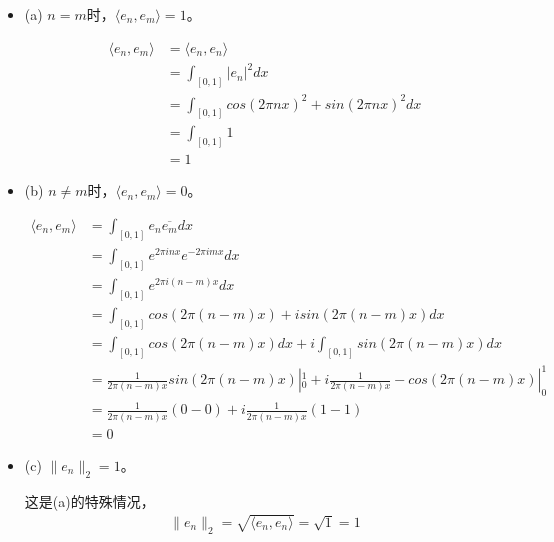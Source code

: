 \documentclass{article}
\begin{document}
\begin{itemize}
  \item (a) $n = m$时，$\langle e_n, e_m \rangle = 1$。

        \begin{align*}
          \langle e_n, e_m \rangle
           & = \langle e_n, e_n \rangle                         \\
           & = \int_{[0, 1]} |e_n|^2 dx                         \\
           & = \int_{[0, 1]} cos(2\pi nx)^2 + sin(2\pi nx)^2 dx \\
           & = \int_{[0, 1]} 1                                  \\
           & = 1
        \end{align*}

  \item (b) $n \neq m$时，$\langle e_n, e_m \rangle = 0$。

        \begin{align*}
          \langle e_n, e_m \rangle
           & = \int_{[0, 1]} e_n \overline{e_m} dx                                                       \\
           & = \int_{[0, 1]} e^{2\pi inx}e^{-2\pi imx} dx                                                \\
           & = \int_{[0, 1]} e^{2\pi i(n-m)x} dx                                                         \\
           & = \int_{[0, 1]} cos(2\pi (n-m)x) + isin(2\pi (n-m)x) dx                                     \\
           & = \int_{[0, 1]} cos(2\pi (n-m)x)dx + i\int_{[0, 1]}sin(2\pi (n-m)x) dx                      \\
           & = \frac{1}{2\pi (n-m)x}sin(2\pi (n-m)x)|_0^1 + i\frac{1}{2\pi (n-m)x}-cos(2\pi (n-m)x)|_0^1 \\
           & = \frac{1}{2\pi (n-m)x}(0 - 0) + i\frac{1}{2\pi (n-m)x}(1 - 1)                              \\
           & = 0
        \end{align*}

  \item (c) $\|e_n\|_2 = 1$。

        这是(a)的特殊情况，
        \begin{align*}
          \|e_n\|_2 = \sqrt{\langle e_n, e_n \rangle} = \sqrt{1} = 1
        \end{align*}
\end{itemize}
\end{document}
